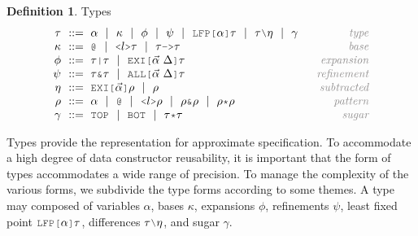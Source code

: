 \documentclass[acmsmall]{acmart}
\theoremstyle{definition}
\newtheorem{definition}{Definition}[section]
\begin{document}
\hfill
\begin{definition} Types 
  \label{def:types}
  \[\begin{array}[t]{r@{}l@{}r}
    \nonterm{\tau} & \is 
    \begin{array}[t]{@{}l}
      \alpha \sep
      \kappa \sep 
      \phi \sep 
      \psi \sep 
      \J{LFP[}\alpha\J{]}\tau \sep
      \tau \typdiff \eta \sep
      \gamma
    \end{array}
    & \com{type}
    \\
    \nonterm{\kappa} & \is 
    \begin{array}[t]{@{}l}
      \J{@} \sep
      \J{<} l \J{>} \tau \sep 
      \tau\J{->}\tau
    \end{array}
    & \com{base}
    \\
    \nonterm{\phi} & \is 
    \begin{array}[t]{@{}l}
      \tau\J{|}\tau \sep 
      \J{EXI[}\vec{\alpha}\ \Delta \J{]} \tau
    \end{array}
    & \com{expansion}
    \\
    \nonterm{\psi} & \is 
    \begin{array}[t]{@{}l}
      \tau\J{\&}\tau \sep 
      \J{ALL[}\vec{\alpha}\ \Delta \J{]} \tau
    \end{array}
    & \com{refinement}
    \\
    \nonterm{\eta} & \is 
    \begin{array}[t]{@{}l}
      \J{EXI[}\vec{\alpha} \J{]} \rho \sep 
      \rho
    \end{array}
    & \com{subtracted}
    \\
    \nonterm{\rho} & \is 
    \begin{array}[t]{@{}l}
      \alpha \sep
      \J{@} \sep
      \J{<}l\J{>}\rho \sep 
      \rho\J{\&}\rho \sep
      \rho\J{*}\rho
    \end{array}
    & \com{pattern}
    \\
    \nonterm{\gamma} & \is 
    \begin{array}[t]{@{}l}
      \J{TOP} \sep \J{BOT} \sep 
      \tau \J{*} \tau 
    \end{array}
    & \com{sugar}
  \end{array}\]
\end{definition}
\hfill

Types provide the representation for approximate specification.
To accommodate a high degree of data constructor reusability,
it is important that the form of types accommodates a wide range of precision.
To manage the complexity of the various forms, we subdivide the type forms
according to some themes.
A type may composed of variables $\alpha$, 
bases $\kappa$, expansions $\phi$, refinements $\psi$,
least fixed point $\J{LFP[}\alpha \J{]} \tau$,
differences $\tau \typdiff \eta$, and sugar $\gamma$.
\end{document}
